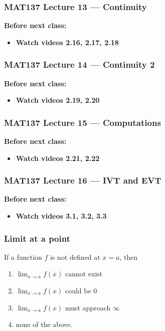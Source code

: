 \documentclass[14pt]{beamer}
\begin{document}
\begin{frame}
\frametitle{MAT137 Lecture 13 --- Continuity}
	{\bf Before next class:}
		\begin{itemize} \normalsize
			\item {\bf Watch videos 2.16, 2.17, 2.18 }
		\end{itemize}
	\vfill

\end{frame}


\begin{frame}
\frametitle{MAT137 Lecture 14 --- Continuity 2}
	{\bf Before next class:}
		\begin{itemize} \normalsize
			\item {\bf Watch videos 2.19, 2.20 }
		\end{itemize}
	\vfill

\end{frame}


\begin{frame}
\frametitle{MAT137 Lecture 15 --- Computations}
	{\bf Before next class:}
		\begin{itemize} \normalsize
			\item {\bf Watch videos 2.21, 2.22 }
		\end{itemize}
	\vfill

\end{frame}


\begin{frame}
\frametitle{MAT137 Lecture 16 --- IVT and EVT}
	{\bf Before next class:}
		\begin{itemize} \normalsize
			\item {\bf Watch videos 3.1, 3.2, 3.3 }
		\end{itemize}
	\vfill

\end{frame}























\begin{frame}
\frametitle{Limit at a point}

If a function $f$ is not defined at $x=a$, then
\begin{enumerate}
\item $\displaystyle{\lim_{x\rightarrow a} f(x)}$ cannot exist
\item $\displaystyle{\lim_{x\rightarrow a} f(x)}$ could be $0$
\item $\displaystyle{\lim_{x\rightarrow a} f(x)}$ must approach $\infty$
\item none of the above.
\end{enumerate} 

\end{frame}
\end{document}

